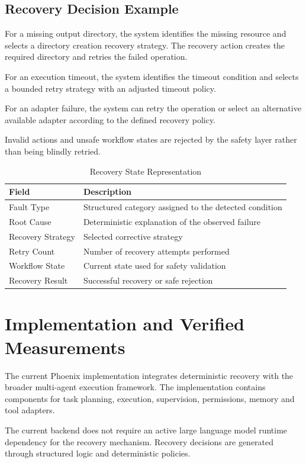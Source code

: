 \documentclass[conference]{IEEEtran}
\begin{document}
\subsection{Recovery Decision Example}
For a missing output directory, the system identifies the missing resource and selects a directory creation recovery strategy. The recovery action creates the required directory and retries the failed operation.

For an execution timeout, the system identifies the timeout condition and selects a bounded retry strategy with an adjusted timeout policy.

For an adapter failure, the system can retry the operation or select an alternative available adapter according to the defined recovery policy.

Invalid actions and unsafe workflow states are rejected by the safety layer rather than being blindly retried.

\begin{table}[htbp]
\caption{Recovery State Representation}
\label{tab:recovery_state}
\centering
\begin{tabular}{p{2.5cm} p{5.5cm}}
\toprule
\textbf{Field} & \textbf{Description} \\
\midrule
Fault Type & Structured category assigned to the detected condition \\
Root Cause & Deterministic explanation of the observed failure \\
Recovery Strategy & Selected corrective strategy \\
Retry Count & Number of recovery attempts performed \\
Workflow State & Current state used for safety validation \\
Recovery Result & Successful recovery or safe rejection \\
\bottomrule
\end{tabular}
\end{table}

\section{Implementation and Verified Measurements}
The current Phoenix implementation integrates deterministic recovery with the broader multi-agent execution framework. The implementation contains components for task planning, execution, supervision, permissions, memory and tool adapters.

The current backend does not require an active large language model runtime dependency for the recovery mechanism. Recovery decisions are generated through structured logic and deterministic policies.
\end{document}

